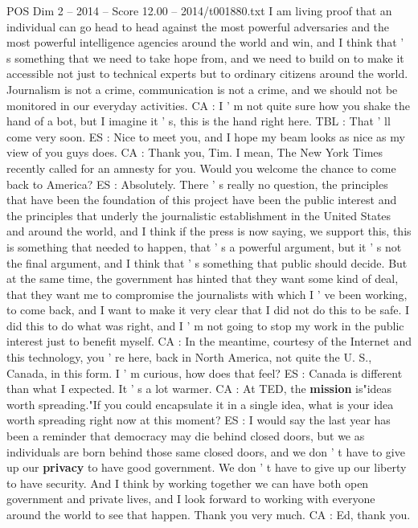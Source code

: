 \begin{textsample}{POS Dim 2 – 2014 – Score 12.00 – 2014/t001880.txt}
I am living proof that an individual can go head to head against the most powerful adversaries and the most powerful intelligence agencies around the world and win, and I think that ' s something that we need to take hope from, and we need to build on to make it accessible not just to technical experts but to ordinary citizens around the world.
Journalism is not a crime, communication is not a crime, and we should not be monitored in our everyday activities.
CA : I ' m not quite sure how you shake the hand of a bot, but I imagine it ' s, this is the hand right here.
TBL : That ' ll come very soon.
ES : Nice to meet you, and I hope my beam looks as nice as my view of you guys does.
CA : Thank you, Tim.
I mean, The New York Times recently called for an amnesty for you.
Would you welcome the chance to come back to America?
ES : Absolutely.
There ' s really no question, the principles that have been the foundation of this project have been the public interest and the principles that underly the journalistic establishment in the United States and around the world, and I think if the press is now saying, we support this, this is something that needed to happen, that ' s a powerful argument, but it ' s not the final argument, and I think that ' s something that public should decide.
But at the same time, the government has hinted that they want some kind of deal, that they want me to compromise the journalists with which I ' ve been working, to come back, and I want to make it very clear that I did not do this to be safe.
I did this to do what was right, and I ' m not going to stop my work in the public interest just to benefit myself.
CA : In the meantime, courtesy of the Internet and this technology, you ' re here, back in North America, not quite the U.
S., Canada, in this form.
I ' m curious, how does that feel?
ES : Canada is different than what I expected.
It ' s a lot warmer.
CA : At TED, the \textbf{mission} is"ideas worth spreading."If you could encapsulate it in a single idea, what is your idea worth spreading right now at this moment?
ES : I would say the last year has been a reminder that democracy may die behind closed doors, but we as individuals are born behind those same closed doors, and we don ' t have to give up our \textbf{privacy} to have good government.
We don ' t have to give up our liberty to have security.
And I think by working together we can have both open government and private lives, and I look forward to working with everyone around the world to see that happen.
Thank you very much.
CA : Ed, thank you.

\end{textsample}

